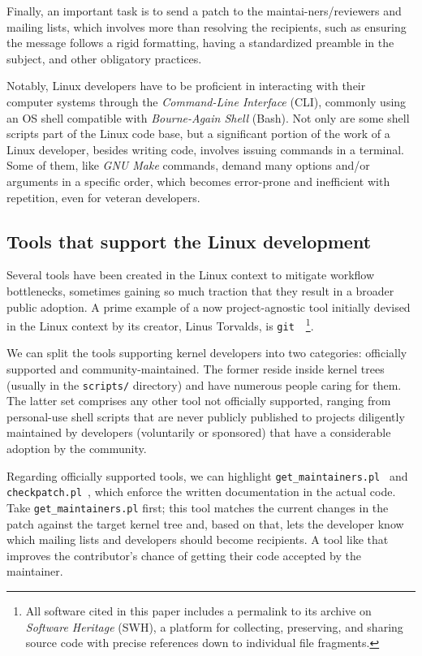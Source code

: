 Finally, an important task is to send a patch to the maintai-ners/reviewers and
mailing lists, which involves more than resolving the recipients, such as
ensuring the message follows a rigid formatting, having a standardized preamble
in the subject, and other obligatory practices.

Notably, Linux developers have to be proficient in interacting with their
computer systems through the \textit{Command-Line Interface} (CLI), commonly
using an OS shell compatible with \textit{Bourne-Again Shell} (Bash). Not only
are some shell scripts part of the Linux code base, but a significant portion of
the work of a Linux developer, besides writing code, involves issuing commands
in a terminal. Some of them, like \textit{GNU Make} commands, demand many
options and/or arguments in a specific order, which becomes error-prone and
inefficient with repetition, even for veteran developers.

\subsection{Tools that support the Linux development}

Several tools have been created in the Linux context to mitigate workflow
bottlenecks, sometimes gaining so much traction that they result in a broader
public adoption. A prime example of a now project-agnostic tool initially
devised in the Linux context by its creator, Linus Torvalds, is
\texttt{git}~\cite{git}~\footnote{All software cited in this paper includes a
permalink to its archive on \textit{Software Heritage} (SWH), a platform for
collecting, preserving, and sharing source code with precise references down to
individual file fragments.}.

We can split the tools supporting kernel developers into two categories:
officially supported and community-maintained. The former reside inside kernel
trees (usually in the \texttt{scripts/} directory) and have numerous people
caring for them. The latter set comprises any other tool not officially
supported, ranging from personal-use shell scripts that are never publicly
published to projects diligently maintained by developers (voluntarily or
sponsored) that have a considerable adoption by the community.

Regarding officially supported tools, we can highlight
\texttt{get\_main\-tainers.pl}~\cite{get-maintainer} and
\texttt{checkpatch.pl}~\cite{checkpatch}, which enforce the written
documentation in the actual code. Take \texttt{get\_maintainers.pl} first; this
tool matches the current changes in the patch against the target kernel tree
and, based on that, lets the developer know which mailing lists and developers
should become recipients. A tool like that improves the contributor's chance of
getting their code accepted by the maintainer.

